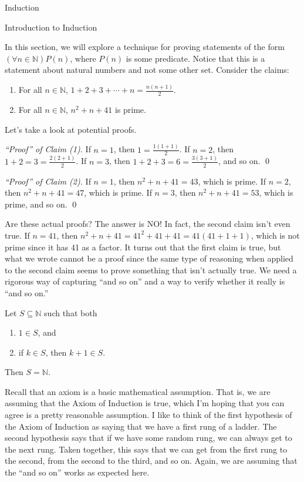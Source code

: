 \begin{chapter}{Induction}

\begin{section}{Introduction to Induction}

In this section, we will explore a technique for proving statements of the form $(\forall n \in \mathbb{N})P(n)$, where $P(n)$ is some predicate.  Notice that this is a statement about natural numbers and not some other set.  Consider the claims:
\begin{enumerate}
\item For all $n\in\mathbb{N}$, $\displaystyle 1+2+3+\cdots +n=\frac{n(n+1)}{2}$.
\item For all $n\in\mathbb{N}$, $n^{2}+n+41$ is prime.
\end{enumerate}
Let's take a look at potential proofs.

\bigskip

\noindent \emph{``Proof'' of Claim (1).} If $n=1$, then $1=\frac{1(1+1)}{2}$.  If $n=2$, then $1+2=3=\frac{2(2+1)}{2}$.  If $n=3$, then $1+2+3=6=\frac{3(3+1)}{2}$, and so on. \hfill \qed

\bigskip

\noindent \emph{``Proof'' of Claim (2).} If $n=1$, then $n^{2}+n+41=43$, which is prime.  If $n=2$, then $n^{2}+n+41=47$, which is prime.  If $n=3$, then $n^{2}+n+41=53$, which is prime, and so on. \hfill \qed

\bigskip

Are these actual proofs?  The answer is NO!  In fact, the second claim isn't even true.  If $n=41$, then $n^{2}+n+41=41^{2}+41+41=41(41+1+1)$, which is not prime since it has 41 as a factor.  It turns out that the first claim is true, but what we wrote cannot be a proof since the same type of reasoning when applied to the second claim seems to prove something that isn't actually true.  We need a rigorous way of capturing ``and so on'' and a way to verify whether it really is ``and so on.''

\begin{axiom}
Let $S\subseteq \mathbb{N}$ such that both
\begin{enumerate}
\item $1\in S$, and
\item if $k\in S$, then $k+1\in S$.
\end{enumerate}
Then $S=\mathbb{N}$.
\end{axiom}

\begin{remark}
Recall that an axiom is a basic mathematical assumption.  That is, we are assuming that the Axiom of Induction is true, which I'm hoping that you can agree is a pretty reasonable assumption.  I like to think of the first hypothesis of the Axiom of Induction as saying that we have a first rung of a ladder.  The second hypothesis says that if we have some random rung, we can always get to the next rung.  Taken together, this says that we can get from the first rung to the second, from the second to the third, and so on.  Again, we are assuming that the ``and so on'' works as expected here.
\end{remark}


\end{section}
\end{chapter}
